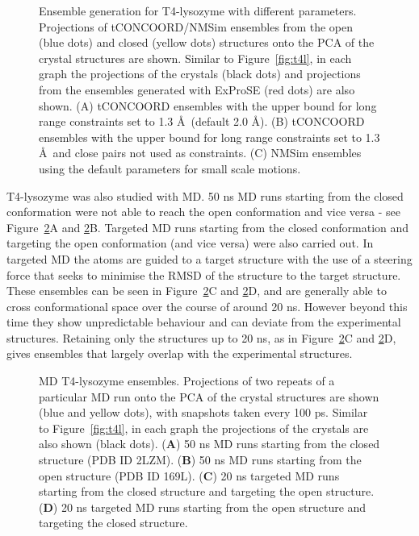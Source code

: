 \begin{figure}
\centering


\caption{Ensemble generation for T4-lysozyme with different parameters.
Projections of tCONCOORD/NMSim ensembles from the open (blue dots) and closed (yellow dots) structures onto the PCA of the crystal structures are shown.
Similar to Figure~\ref{fig:t4l}, in each graph the projections of the crystals (black dots) and projections from the ensembles generated with ExProSE (red dots) are also shown.
(A) tCONCOORD ensembles with the upper bound for long range constraints set to 1.3 \AA\ (default 2.0 \AA ).
(B) tCONCOORD ensembles with the upper bound for long range constraints set to 1.3 \AA\ and close pairs not used as constraints.
(C) NMSim ensembles using the default parameters for small scale motions.}

\label{fig:method_params}
\end{figure}


T4-lysozyme was also studied with MD.
50 ns MD runs starting from the closed conformation were not able to reach the open conformation and vice versa - see Figure~\ref{fig:t4l_md}A and \ref{fig:t4l_md}B.
Targeted MD runs starting from the closed conformation and targeting the open conformation (and vice versa) were also carried out.
In targeted MD the atoms are guided to a target structure with the use of a steering force that seeks to minimise the RMSD of the structure to the target structure.
These ensembles can be seen in Figure~\ref{fig:t4l_md}C and \ref{fig:t4l_md}D, and are generally able to cross conformational space over the course of around 20 ns.
However beyond this time they show unpredictable behaviour and can deviate from the experimental structures.
Retaining only the structures up to 20 ns, as in Figure~\ref{fig:t4l_md}C and \ref{fig:t4l_md}D, gives ensembles that largely overlap with the experimental structures.


\begin{figure}
\centering


\caption{MD T4-lysozyme ensembles.
Projections of two repeats of a particular MD run onto the PCA of the crystal structures are shown (blue and yellow dots), with snapshots taken every 100 ps.
Similar to Figure~\ref{fig:t4l}, in each graph the projections of the crystals are also shown (black dots).
(\textbf{A}) 50 ns MD runs starting from the closed structure (PDB ID 2LZM).
(\textbf{B}) 50 ns MD runs starting from the open structure (PDB ID 169L).
(\textbf{C}) 20 ns targeted MD runs starting from the closed structure and targeting the open structure.
(\textbf{D}) 20 ns targeted MD runs starting from the open structure and targeting the closed structure.}

\label{fig:t4l_md}
\end{figure}


